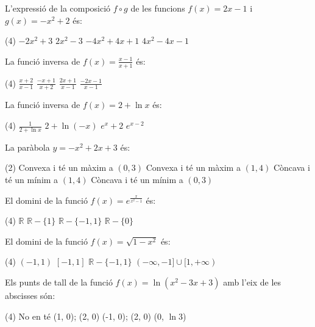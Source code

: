 \newpage
\begin{autoaval}{55}

\begin{mylist}
\exer[2] L'expressió de la composició $f\circ g$ de les funcions $f(x)=2x-1$ i $g(x)=-x^2+2$ és:
	\begin{tasks}(4)
		\task $-2x^2+3$
		\task $2x^2-3$
		\task $-4x^2+4x+1$
		\task $4x^2-4x-1$
		\end{tasks}

\exer La funció inversa de $f(x)=\frac{x-1}{x+1}$ és:
\begin{tasks}(4)
	\task $\frac{x+2}{x-1}$
	\task $\frac{-x+1}{x+2}$
	\task $\frac{2x+1}{x-1}$
	\task $\frac{-2x-1}{x-1}$
\end{tasks}

\exer La funció inversa de $f(x)=2+\ln x$ és:
\begin{tasks}(4)
	\task $\frac{1}{2 + \ln x}$
	\task $2+\ln (-x)$
	\task $e^{x}+2$
	\task $e^{x-2}$
\end{tasks}

\exer La paràbola $y=-x^2+2x+3$ és:
	\begin{tasks}(2)
	\task Convexa i té un màxim a $(0,3)$
	\task Convexa i té un màxim a $(1,4)$
	\task Còncava i té un mínim a $(1,4)$
	\task Còncava i té un mínim a $(0,3)$
\end{tasks}

\exer El domini de la funció $f(x)=e^{\frac{x}{x^2-1}}$ és:
	\begin{tasks}(4)
	\task $\mathbb{R}$
	\task $\mathbb{R}-\{1\}$
	\task $\mathbb{R}-\{-1,1\}$
	\task $\mathbb{R}-\{0\}$
	\end{tasks}


\exer El domini de la funció $f(x)=\sqrt{1-x^2}$ és:
\begin{tasks}(4)
	\task $(-1,1)$
	\task $[-1,1]$
	\task $\mathbb{R}-\{-1,1\}$
	\task $(-\infty,-1]\cup[1,+\infty)$
\end{tasks}

\exer Els punts de tall de la funció $f(x)=\ln(x^2-3x+3)$ amb l'eix de les abscisses són:
	\begin{tasks}(4)
	\task No en té
	\task (1, 0); (2, 0)
	\task (-1, 0); (2, 0)
	\task (0, $\ln 3$)
\end{tasks}


\end{mylist}
\end{autoaval}
